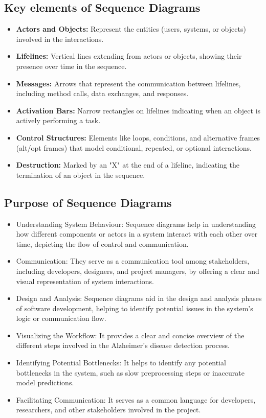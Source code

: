\subsection{Key elements of Sequence Diagrams}

\begin{itemize}
    \item \textbf{Actors and Objects:} Represent the entities (users, systems, or objects) involved in the interactions.
    \item \textbf{Lifelines:} Vertical lines extending from actors or objects, showing their presence over time in the sequence.
    \item \textbf{Messages:} Arrows that represent the communication between lifelines, including method calls, data exchanges, and responses.
    \item \textbf{Activation Bars:} Narrow rectangles on lifelines indicating when an object is actively performing a task.
    \item \textbf{Control Structures:} Elements like loops, conditions, and alternative frames (alt/opt frames) that model conditional, repeated, or optional interactions.
    \item \textbf{Destruction:} Marked by an "X" at the end of a lifeline, indicating the termination of an object in the sequence.
\end{itemize}
\subsection{Purpose of Sequence Diagrams}
\begin{itemize}
    \item {Understanding System Behaviour:} Sequence diagrams help in understanding how different components or actors in a system interact with each other over time, depicting the flow of control and communication.
    \item {Communication:} They serve as a communication tool among stakeholders, including developers, designers, and project managers, by offering a clear and visual representation of system interactions.
    \item {Design and Analysis:} Sequence diagrams aid in the design and analysis phases of software development, helping to identify potential issues in the system’s logic or communication flow.
    \item {Visualizing the Workflow:} It provides a clear and concise overview of the different steps involved in the Alzheimer’s disease detection process.
    \item {Identifying Potential Bottlenecks:} It helps to identify any potential bottlenecks in the system, such as slow preprocessing steps or inaccurate model predictions.
    \item {Facilitating Communication:} It serves as a common language for developers, researchers, and other stakeholders involved in the project.
\end{itemize}

